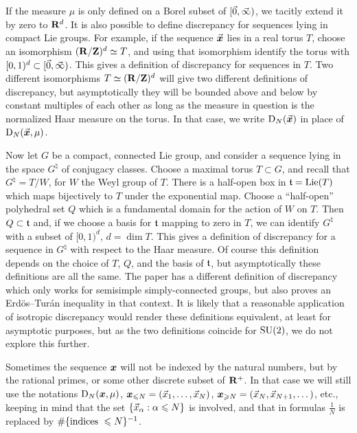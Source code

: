 If the measure $\mu$ is only defined on a Borel subset of $[\vec{0},\vec{\infty})$, we 
tacitly extend it by zero to $\mathbf{R}^d$. It is also possible to define discrepancy 
for sequences lying in compact Lie groups. For example, if the sequence $\vec{\boldsymbol x}$ 
lies in a real torus $T$, choose an isomorphism $(\mathbf{R}/\mathbf{Z})^d \simeq T$, and 
using that isomorphism identify the torus with  $[0,1)^d\subset [\vec{0},\vec{\infty})$. 
This gives a definition of discrepancy for sequences in $T$. Two different 
isomorphisms $T\simeq (\mathbf{R}/\mathbf{Z})^d$ will give two different definitions of 
discrepancy, but asymptotically they will be bounded above and below by 
constant multiples of each other as long as the measure in question is the 
normalized Haar measure on the torus. In that case, we write $\operatorname{D}_N(\vec{\boldsymbol x})$ in 
place of $\operatorname{D}_N(\vec{\boldsymbol x}, \mu)$. 

Now let $G$ be a compact, connected Lie group, and consider a sequence 
lying in the space $G^\natural$ of conjugacy classes. Choose a maximal torus $T\subset G$, and recall that 
$G^\natural = T/W$, for $W$ the Weyl group of $T$. There is a half-open 
box in $\mathfrak{t} = \operatorname{Lie}(T)$ which maps bijectively to $T$ under the exponential 
map. Choose a ``half-open'' polyhedral set $Q$ which is a fundamental domain for 
the action of $W$ on $T$. Then $Q\subset \mathfrak{t}$ and, if we choose a basis for 
$\mathfrak{t}$ mapping to zero in $T$, we can identify $G^\natural$ with a subset of 
$[0,1)^d$, $d = \dim T$. This gives a definition of discrepancy for 
a sequence in $G^\natural$ with respect to the Haar measure. Of course this 
definition depends on the choice of $T$, $Q$, and the basis of $\mathfrak{t}$, but 
asymptotically these definitions are all the same. The paper 
\cite{rosengarten-2013} has a different definition of discrepancy which only 
works for semisimple simply-connected groups, but also proves an 
Erd\"os--Tur\'an inequality in that context. It is likely that a reasonable 
application of isotropic discrepancy would render these definitions equivalent, 
at least for asymptotic purposes, but as the two definitions coincide for 
$\operatorname{SU}(2)$, we do not explore this further. 

Sometimes the sequence ${\boldsymbol x}$ will not be indexed by the natural numbers, but 
by the rational primes, or some other discrete subset of $\mathbf{R}^+$. In that case 
we will still use the notations $\operatorname{D}_N({\boldsymbol x},\mu)$, 
${\boldsymbol x}_{\leqslant N} = (\vec{x}_1,\dots,\vec{x}_N)$, 
${\boldsymbol x}_{\geqslant N} = (\vec{x}_N,\vec{x}_{N+1},\dots)$, etc., 
keeping in mind that the set $\{\vec{x}_\alpha : \alpha \leqslant N\}$ is involved, 
and that in formulas $\frac{1}{N}$ is replaced by 
$\#\{\textnormal{indices }\leqslant N\}^{-1}$. 

